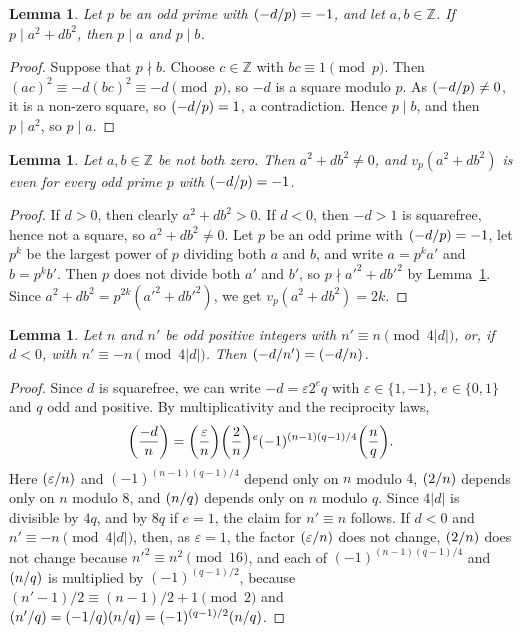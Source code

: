 \documentclass[11pt]{article}
\newtheorem{lemma}[theorem]{Lemma}
\newcommand{\Z}{\mathbb{Z}}
\newcommand{\leg}[2]{\mathchoice{\biggl(\dfrac{#1}{#2}\biggr)}{(#1/#2)}{(#1/#2)}{(#1/#2)}}
\begin{document}
\begin{lemma}\label{lem:divides}
Let $p$ be an odd prime with $\leg{-d}{p}=-1$, and let $a,b\in\Z$. If $p\mid a^2+db^2$, then $p\mid a$ and $p\mid b$.
\end{lemma}

\begin{proof}
Suppose that $p\nmid b$. Choose $c\in\Z$ with $bc\equiv1\pmod p$. Then $(ac)^2\equiv-d(bc)^2\equiv-d\pmod p$, so $-d$ is a square modulo $p$. As $\leg{-d}{p}\neq0$, it is a non-zero square, so $\leg{-d}{p}=1$, a contradiction. Hence $p\mid b$, and then $p\mid a^2$, so $p\mid a$.
\end{proof}

\begin{lemma}\label{lem:even}
Let $a,b\in\Z$ be not both zero. Then $a^2+db^2\neq0$, and $v_p(a^2+db^2)$ is even for every odd prime $p$ with $\leg{-d}{p}=-1$.
\end{lemma}

\begin{proof}
If $d>0$, then clearly $a^2+db^2>0$. If $d<0$, then $-d>1$ is squarefree, hence not a square, so $a^2+db^2\neq0$. Let $p$ be an odd prime with $\leg{-d}{p}=-1$, let $p^k$ be the largest power of $p$ dividing both $a$ and $b$, and write $a=p^ka'$ and $b=p^kb'$. Then $p$ does not divide both $a'$ and $b'$, so $p\nmid a'^2+db'^2$ by Lemma~\ref{lem:divides}. Since $a^2+db^2=p^{2k}(a'^2+db'^2)$, we get $v_p(a^2+db^2)=2k$.
\end{proof}

\begin{lemma}\label{lem:period}
Let $n$ and $n'$ be odd positive integers with $n'\equiv n\pmod{4|d|}$, or, if $d<0$, with $n'\equiv-n\pmod{4|d|}$. Then $\leg{-d}{n'}=\leg{-d}{n}$.
\end{lemma}

\begin{proof}
Since $d$ is squarefree, we can write $-d=\varepsilon2^eq$ with $\varepsilon\in\{1,-1\}$, $e\in\{0,1\}$ and $q$ odd and positive. By multiplicativity and the reciprocity laws,
\[
\leg{-d}{n}=\leg{\varepsilon}{n}\leg{2}{n}^e(-1)^{(n-1)(q-1)/4}\leg{n}{q}.
\]
Here $\leg{\varepsilon}{n}$ and $(-1)^{(n-1)(q-1)/4}$ depend only on $n$ modulo $4$, $\leg{2}{n}$ depends only on $n$ modulo $8$, and $\leg{n}{q}$ depends only on $n$ modulo $q$. Since $4|d|$ is divisible by $4q$, and by $8q$ if $e=1$, the claim for $n'\equiv n$ follows. If $d<0$ and $n'\equiv-n\pmod{4|d|}$, then, as $\varepsilon=1$, the factor $\leg{\varepsilon}{n}$ does not change, $\leg{2}{n}$ does not change because $n'^2\equiv n^2\pmod{16}$, and each of $(-1)^{(n-1)(q-1)/4}$ and $\leg{n}{q}$ is multiplied by $(-1)^{(q-1)/2}$, because $(n'-1)/2\equiv(n-1)/2+1\pmod 2$ and $\leg{n'}{q}=\leg{-1}{q}\leg{n}{q}=(-1)^{(q-1)/2}\leg{n}{q}$.
\end{proof}
\end{document}
